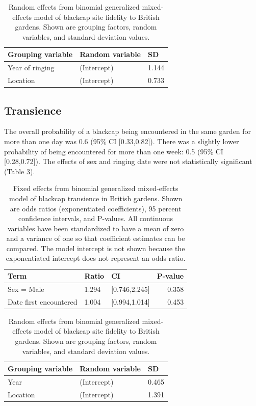\documentclass[a4paper, twoside]{templates/ociamthesis}
\begin{document}
\begin{table}[t]

\caption{\label{tab:fidelity-model-table}Random effects from binomial generalized mixed-effects model of blackcap site fidelity to British gardens. Shown are grouping factors, random variables, and standard deviation values.}
\centering
\begin{tabular}{l|l|l}
\hline
Grouping variable & Random variable & SD\\
\hline
Year of ringing & (Intercept) & 1.144\\
\hline
Location & (Intercept) & 0.733\\
\hline
\end{tabular}
\end{table}

\hypertarget{transience-1}{%
\subsection{Transience}\label{transience-1}}

The overall probability of a blackcap being encountered in the same garden for more than one day was 0.6 (95\% CI {[}0.33,0.82{]}). There was a slightly lower probability of being encountered for more than one week: 0.5 (95\% CI {[}0.28,0.72{]}). The effects of sex and ringing date were not statistically significant (Table \ref{tab:transience-model-table}).

\begin{table}[t]

\caption{\label{tab:transience-model-table}Fixed effects from binomial generalized mixed-effects model of blackcap transience in British gardens. Shown are odds ratios (exponentiated coefficients), 95 percent confidence intervals, and P-values. All continuous variables have been standardized to have a mean of zero and a variance of one so that coefficient estimates can be compared. The model intercept is not shown because the exponentiated intercept does not represent an odds ratio.}
\centering
\begin{tabular}{l|l|l|r}
\hline
Term & Ratio & CI & P-value\\
\hline
Sex = Male & 1.294 & [0.746,2.245] & 0.358\\
\hline
Date first encountered & 1.004 & [0.994,1.014] & 0.453\\
\hline
\end{tabular}
\end{table}

\begin{table}[t]

\caption{\label{tab:transience-model-table}Random effects from binomial generalized mixed-effects model of blackcap site fidelity to British gardens. Shown are grouping factors, random variables, and standard deviation values.}
\centering
\begin{tabular}{l|l|l}
\hline
Grouping variable & Random variable & SD\\
\hline
Year & (Intercept) & 0.465\\
\hline
Location & (Intercept) & 1.391\\
\hline
\end{tabular}
\end{table}
\end{document}
